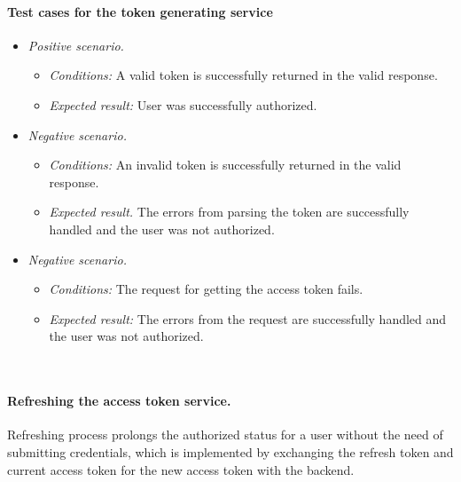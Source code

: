 \paragraph*{Test cases for the token generating service} 
\begin{itemize}
    \item \emph{Positive scenario.} 
        \begin{itemize}
            \item \emph{Conditions:} A valid token is successfully returned in the valid response.
            \item \emph{Expected result:} User was successfully authorized.
        \end{itemize}
    \item \emph{Negative scenario.} 
        \begin{itemize}
            \item \emph{Conditions:} An invalid token is successfully returned in the valid response.
            \item \emph{Expected result.} The errors from parsing the token are successfully handled and the user was not authorized.
        \end{itemize}
    \item \emph{Negative scenario.} 
        \begin{itemize}
            \item \emph{Conditions:} The request for getting the access token fails.
            \item \emph{Expected result:} The errors from the request are successfully handled and the user was not authorized.
        \end{itemize}
\end{itemize}

\

\paragraph*{Refreshing the access token service.} Refreshing process prolongs the authorized status for a user without the need of submitting credentials, which is implemented by exchanging the refresh token and current access token for the new access token with the backend. 


